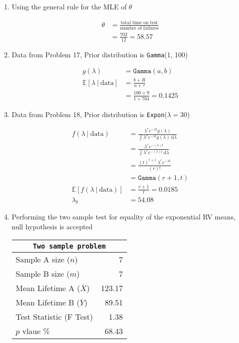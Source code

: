 \begin{enumerate}
\begin{table}[H]
		\end{table}
		\bigskip
	
	\item Using the general rule for the MLE of \(\theta\)
	
	\begin{align}
		\widehat{\theta} &= \frac{\text{total time on test}}{\text{number of failures}} \\
		&= \frac{702}{12} = 58.57 \nonumber
	\end{align}

	\item Data from Problem 17, Prior distribution is \texttt{Gamma}(1, 100)
	
	\begin{align}
		g(\lambda) &= \texttt{Gamma}(a, b) \\[1ex]
		\mathbb{E}[\lambda\ |\ \text{data}] &= \frac{b+R}{a+\tau} \nonumber\\[1ex]
		&= \frac{100 + 9}{1 + 764} = 0.1425
	\end{align}
	
	\item Data from Problem 18, Prior distribution is \texttt{Expon}(\(\lambda = 30\))
	
	\begin{align}
		f(\lambda\ |\ \text{data}) &= \frac{\lambda^r e^{-\lambda t} g(\lambda)}{\int \lambda^r e^{-\lambda t} g(\lambda)\ \mathrm{d} \lambda} \nonumber \\[1ex]
		&= \frac{\lambda^{r} e^{- (\lambda) t}}{\int  \lambda^{r} e^{- (\lambda) t}\ \mathrm{d} \lambda} \nonumber \\[1ex]
		&= \frac{(t)^{r+1}\ \lambda^{r} e^{-\lambda t}}{(r)!} \nonumber \\[1ex]
		&= \texttt{Gamma}(r+1, t) \\
		\mathbb{E}[f(\lambda\ |\ \text{data})] &= \frac{r+1}{t} = 0.0185 \\[1ex]
		\lambda_b &= 54.08
	\end{align}

	\item Performing the two sample test for equality of the exponential RV means, null hypothesis is accepted
	
	\begin{table}[H]
		\centering
		\begin{tabular}{@{}lr@{}}
		\toprule
		\multicolumn{2}{c}{\texttt{Two sample problem}}
		 \\
		\midrule
		Sample A size ($n$)              &       7 \\
		Sample B size ($m$)              &       7 \\
		Mean Lifetime A ($\overline{X}$) &  123.17 \\
		Mean Lifetime B ($\overline{Y}$) &   89.51 \\
		Test Statistic (F Test)          &    1.38 \\
		$p$ vlaue \%                     &    68.43 \\
		\bottomrule
		\end{tabular}
		

\end{table}
\end{enumerate}
